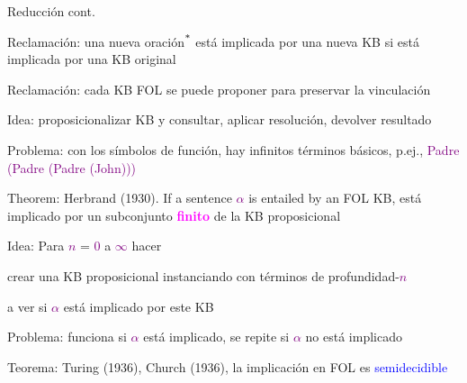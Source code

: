 \begin{frame}{Reducción cont.}
    
    Reclamación: una nueva oración\textcolor{purple}{$\textsuperscript{*}$} está implicada por una nueva KB si está implicada por una KB original
    \bigskip
    
    Reclamación: cada KB FOL se puede proponer para preservar la vinculación
    \bigskip
    
    Idea: proposicionalizar KB y consultar, aplicar resolución, devolver resultado
    \bigskip
    
    Problema: con los símbolos de función, hay infinitos términos básicos,
    \quad p.ej., {\selectfont
    \textcolor{purple}{Padre (Padre (Padre (John)))}}
    \bigskip
    
    Theorem: Herbrand (1930). If a sentence \textcolor{purple}{$\alpha$} is entailed by an FOL KB,
    \quad está implicado por un subconjunto \textcolor{magenta}{\textbf{finito}} de la KB proposicional
    \bigskip
    
    Idea: Para \textcolor{purple}{\(n\)} = \textcolor{purple}{0} a \textcolor{purple}{$\infty$} hacer
    
    \quad crear una KB proposicional instanciando con términos de profundidad-\textcolor{purple}{\(n\)}
    
    \quad a ver si \textcolor{purple}{$\alpha$} está implicado por este KB
    \bigskip
    
    Problema: funciona si \textcolor{purple}{$\alpha$} está implicado, se repite si \textcolor{purple}{$\alpha$} no está implicado
    \bigskip
    
    Teorema: Turing (1936), Church (1936), la implicación en FOL es \textcolor{blue}{semidecidible}

    
    
\end{frame}